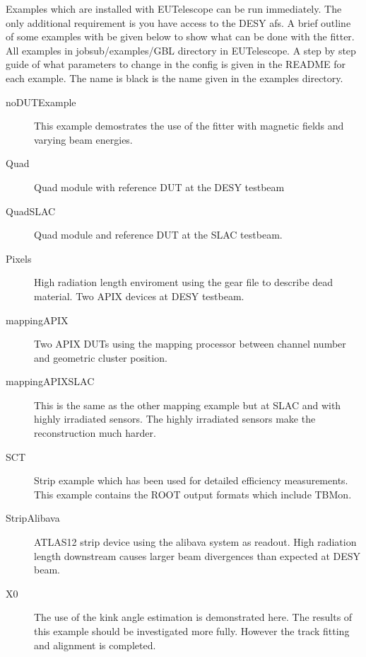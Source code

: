 
Examples which are installed with EUTelescope can be run immediately. The only additional requirement is you have access to the DESY afs. A brief outline of some examples with be given below to show what can be done with the fitter. All examples in jobsub/examples/GBL directory in EUTelescope. A step by step guide of what parameters to change in the config is given in the README for each example. The name is black is the name given in the examples directory.

\begin{description} 
\item[noDUTExample] This example demostrates the use of the fitter with magnetic fields and varying beam energies.
\item[Quad] Quad module with reference DUT at the DESY testbeam 
\item[QuadSLAC]  Quad module and reference DUT at the SLAC testbeam.
\item[Pixels] High radiation length enviroment using the gear file to describe dead material. Two APIX devices at DESY testbeam.
\item[mappingAPIX] Two APIX DUTs using the mapping processor between channel number and geometric cluster position.
\item[mappingAPIXSLAC] This is the same as the other mapping example but at SLAC and with highly irradiated sensors. The highly irradiated sensors make the reconstruction much harder.
\item[SCT] Strip example which has been used for detailed efficiency measurements. This example contains the ROOT output formats which include TBMon.
\item[StripAlibava] ATLAS12 strip device using the alibava system as readout. High radiation length downstream causes larger beam divergences than expected at DESY beam.
\item[X0] The use of the kink angle estimation is demonstrated here. The results of this example should be investigated more fully. However the track fitting and alignment is completed. 
\end{description} 